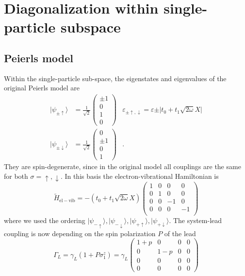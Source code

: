 \documentclass{article}
\begin{document}
\section{Diagonalization within single-particle subspace}
\subsection{Peierls model}
Within the single-particle sub-space, the eigenstates and eigenvalues of the original Peierls model are 
\begin{align}
	\vert \psi_{\pm \uparrow}\rangle &= \frac{1}{\sqrt{2}}\begin{pmatrix}
		\pm 1 \\
		0 \\
		1 \\
		0
	\end{pmatrix} & \varepsilon_{\pm \uparrow,\downarrow} = \varepsilon\pm \vert t_0+t_1\sqrt{2\omega}X\vert\\
	\vert \psi_{\pm \downarrow}\rangle &= \frac{1}{\sqrt{2}}\begin{pmatrix}
		0 \\
		\pm 1 \\
		0 \\
		1
	\end{pmatrix} & .
\end{align}
They are spin-degenerate, since in the original model all couplings are the same for both $\sigma=\uparrow,\downarrow$. In this basis the electron-vibrational Hamiltonian is 
\begin{equation}
	\tilde{H}_\mathrm{el-vib} = -(t_0 + t_1\sqrt{2\omega}X)\begin{pmatrix}
		1 & 0 & 0 & 0\\
		0 & 1 & 0 & 0\\
		0 & 0 & -1 & 0\\
		0 & 0 & 0 & -1\\
	\end{pmatrix}
\end{equation} 
where we used the ordering $\vert \psi_{-\uparrow}\rangle, \vert \psi_{-\downarrow}\rangle, \vert \psi_{+\uparrow}\rangle, \vert \psi_{+\downarrow}\rangle$. 
The system-lead coupling is now depending on the spin polarization $P$ of the lead
\begin{equation}
	\Gamma_L = \gamma_L (1+P\sigma^z_1) = \gamma_L \begin{pmatrix}
	1+p & 0 & 0 & 0\\
	0 & 1-p & 0 & 0\\
	0 & 0 & 0 & 0\\
	0 & 0 & 0 & 0
	\end{pmatrix}
\end{equation}
\end{document}
